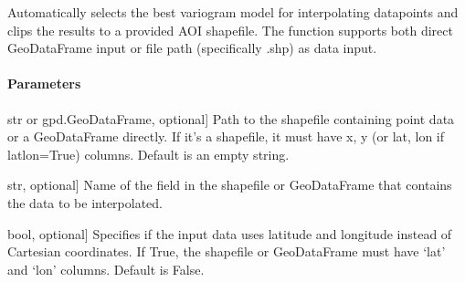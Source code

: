 \documentclass[letterpaper,10pt,english]{sphinxmanual}
\begin{document}
\begin{fulllineitems}
\label{\detokenize{akhdefo_functions:akhdefo_functions.Akhdefo_utils.Auto_Variogram}}
\pysigstartsignatures
{}
\pysigstopsignatures
\sphinxAtStartPar
Automatically selects the best variogram model for interpolating datapoints and clips the results 
to a provided AOI shapefile. The function supports both direct GeoDataFrame input or file path 
(specifically .shp) as data input.


\paragraph{Parameters}
\label{\detokenize{akhdefo_functions:id21}}\begin{description}
\sphinxlineitem{data}{[}str or gpd.GeoDataFrame, optional{]}
\sphinxAtStartPar
Path to the shapefile containing point data or a GeoDataFrame directly.
If it’s a shapefile, it must have x, y (or lat, lon if latlon=True) columns. 
Default is an empty string.

\sphinxlineitem{column\_attribute}{[}str, optional{]}
\sphinxAtStartPar
Name of the field in the shapefile or GeoDataFrame that contains the data to be interpolated.

\sphinxlineitem{latlon}{[}bool, optional{]}
\sphinxAtStartPar
Specifies if the input data uses latitude and longitude instead of Cartesian coordinates. 
If True, the shapefile or GeoDataFrame must have ‘lat’ and ‘lon’ columns.
Default is False.


\end{description}
\end{fulllineitems}
\end{document}
